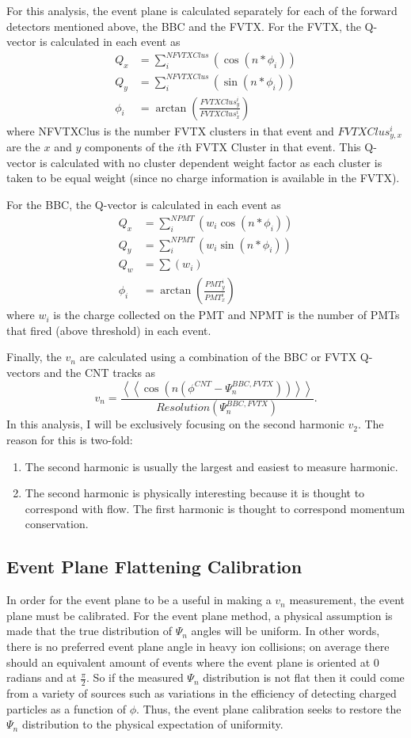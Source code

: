 For this analysis, the event plane is calculated separately for each of the forward detectors mentioned above, the BBC and the FVTX. For the FVTX, the Q-vector is calculated in each event as
\begin{align}
Q_x &= \sum^{NFVTXClus}_i( \cos(n * \phi_i)) \\
Q_y &= \sum^{NFVTXClus}_i( \sin(n * \phi_i)) \\
\phi_i &= \arctan(\frac{FVTXClus_{y}^i}{FVTXClus_{x}^i})
\end{align}
where NFVTXClus is the number FVTX clusters in that event and $FVTXClus_{y,x}^i$ are the $x$ and $y$ components of the $i$th FVTX Cluster in that event. This Q-vector is calculated with no cluster dependent weight factor as each cluster is taken to be equal weight (since no charge information is available in the FVTX).

For the BBC, the Q-vector is calculated in each event as
\begin{align}
Q_x &= \sum^{NPMT}_i( w_i \cos(n * \phi_i)) \\
Q_y &= \sum^{NPMT}_i( w_i \sin(n * \phi_i)) \\
Q_w &= \sum( w_i ) \\
\phi_i &= \arctan(\frac{PMT_{y}^i}{PMT_{x}^i}) 
\end{align}
where $w_i$ is the charge collected on the PMT and NPMT is the number of PMTs that fired (above threshold) in each event.

Finally, the $v_n$ are calculated using a combination of the BBC or FVTX Q-vectors and the CNT tracks as
\begin{equation}
v_n = \frac{\left<\left<\cos(n(\phi^{CNT} - \Psi^{BBC,FVTX}_n))\right>\right>}{Resolution(\Psi^{BBC,FVTX}_n)}.
\end{equation}
In this analysis, I will be exclusively focusing on the second harmonic $v_2$. The reason for this is two-fold:
\begin{enumerate}
	\item{The second harmonic is usually the largest and easiest to measure harmonic.}
	\item{The second harmonic is physically interesting because it is thought to correspond with flow. The first harmonic is thought to correspond momentum conservation.}
\end{enumerate}
\subsection{Event Plane Flattening Calibration}
In order for the event plane to be a useful in making a $v_n$ measurement, the event plane must be calibrated. For the event plane method, a physical assumption is made that the true
distribution of $\Psi_n$ angles will be uniform. In other words, there is no preferred event plane angle in heavy ion collisions; on average there should an equivalent amount of events where the
event plane is oriented at 0 radians and at $\frac{\pi}{2}$. So if the measured $\Psi_n$ distribution is not flat then it could come from a variety of sources such as variations in the efficiency of detecting charged particles as a function of $\phi$. Thus, the event plane calibration seeks to restore the $\Psi_n$ distribution to the physical expectation of uniformity.


